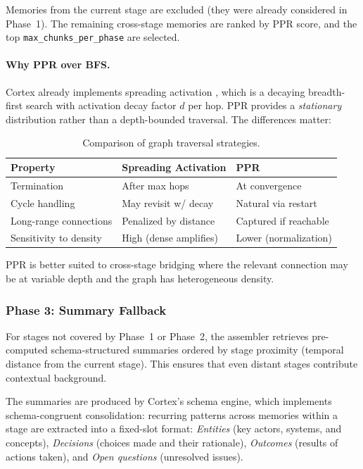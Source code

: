 \documentclass[11pt]{article}
\begin{document}
Memories from the current stage are excluded (they were already
considered in Phase~1).  The remaining cross-stage memories are ranked
by PPR score, and the top \texttt{max\_chunks\_per\_phase} are
selected.

\paragraph{Why PPR over BFS.}
Cortex already implements spreading activation \citep{Collins1975},
which is a decaying breadth-first search with activation decay factor
$d$ per hop.  PPR provides a \emph{stationary} distribution rather
than a depth-bounded traversal.  The differences matter:

\begin{table}[h]
\centering
\caption{Comparison of graph traversal strategies.}
\label{tab:ppr-vs-bfs}
\small
\begin{tabular}{lll}
\toprule
Property & Spreading Activation & PPR \\
\midrule
Termination & After max hops & At convergence \\
Cycle handling & May revisit w/ decay & Natural via restart \\
Long-range connections & Penalized by distance & Captured if reachable \\
Sensitivity to density & High (dense amplifies) & Lower (normalization) \\
\bottomrule
\end{tabular}
\end{table}

PPR is better suited to cross-stage bridging where the relevant
connection may be at variable depth and the graph has heterogeneous
density.

\subsubsection{Phase 3: Summary Fallback}
\label{sec:phase3}

For stages not covered by Phase~1 or Phase~2, the assembler retrieves
pre-computed schema-structured summaries ordered by stage proximity
(temporal distance from the current stage).  This ensures that even
distant stages contribute contextual background.

The summaries are produced by Cortex's schema engine, which implements
\citet{Tse2007} schema-congruent consolidation: recurring patterns
across memories within a stage are extracted into a fixed-slot format:
\emph{Entities} (key actors, systems, and concepts),
\emph{Decisions} (choices made and their rationale),
\emph{Outcomes} (results of actions taken), and
\emph{Open questions} (unresolved issues).
\end{document}
